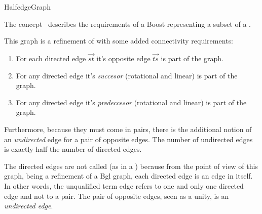 
\begin{ccRefConcept}{HalfedgeGraph}


\ccDefinition

The concept \ccRefName\ describes the requirements of a
Boost 
representing a subset of a .

This graph is a refinement of  with 
some added connectivity requirements:
 
\begin{enumerate}
\item For each directed edge $\overrightarrow{st}$
it's opposite edge $\overrightarrow{ts}$ is part of the graph.

\item For any directed edge it's {\em succesor} (rotational and linear)
is part of the graph.

\item For any directed edge it's {\em predeccesor} (rotational and linear) 
is part of the graph.
\end{enumerate}

Furthermore, because they must come in pairs, there is the additional
notion of an {\em undirected} edge for a pair of opposite edges.
The number of undirected edges is exactly half the number of directed edges.

The directed edges are not called  (as in a
) because from the point of view of this graph, being
a refinement of a {\sc Bgl} graph, each directed edge is an
edge in itself. In other words, the unqualified term edge
refers to one and only one directed edge and not to a pair. The
pair of opposite edges, seen as a unity, is an {\em undirected edge}.
 

\end{ccRefConcept}
